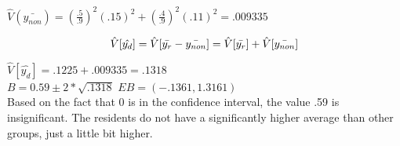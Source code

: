 \documentclass{article}
\begin{document}
\begin{center}
    $\hat{V}(\bar{y_{non}}) = (\frac{.5}{.9})^2 (.15)^2 + (\frac{.4}{.9})^2 (.11)^2 = .009335 $
\end{center}
\begin{equation}
    \hat{V}[\hat{y_d}] = \hat{V}[\bar{y_r} - \bar{y_{non}}] \\
    = \hat{V}[\bar{y_r}] + \hat{V}[\bar{y_{non}}] \\
\end{equation}
\begin{center}
    $\hat{V}[\hat{y_d}] = .1225 + .009335 = .1318$ \\
    \smallskip
    $B = 0.59 \pm 2* \sqrt{.1318}$ 
    \hspace{.5cm}
    $EB = (-.1361, 1.3161)$ \\
    \smallskip
    Based on the fact that 0 is in the confidence interval, the value .59 is insignificant. The residents do not have a significantly higher average than other groups, just a little bit higher. 
\end{center}
\end{document}
